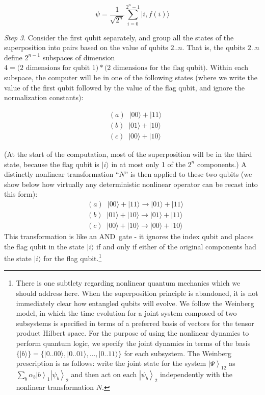 \documentclass[12pt]{article}
\begin{document}
\begin{equation}
\psi=\frac{1}{\sqrt{2^{n}}}\sum\limits_{i=0}^{2^{n}-1}|i,f(i)\rangle
\end{equation}

\medskip\noindent
{\it Step 3}. Consider the first qubit separately, and group all the states of the
superposition into pairs based on the value of qubits $2..n$. That is, the
qubits $2..n$ define $2^{n-1}$ subspaces of dimension $4 = \text{(2 dimensions for
qubit 1)} * \text{(2 dimensions for the flag qubit)}$. Within each subspace, the
computer will be in one of the following states (where we write the value of
the first qubit followed by the value of the flag qubit, and ignore the
normalization constants):%

\begin{align}
&  (a)\;\;|00\rangle+|11\rangle\nonumber\\
&  (b)\;\;|01\rangle+|10\rangle\\
&  (c)\;\;|00\rangle+|10\rangle\nonumber
\end{align}

(At the start of the computation, most of the superposition will be in the
third state, because the flag qubit is
$\vert i \rangle$
in at most only 1 of the $2^{n}$ components.) A distinctly nonlinear
transformation ``$N$'' is then applied to these two qubits (we show below how
virtually any deterministic nonlinear operator can be recast into this form):
\begin{align}
&  (a)\;\;|00\rangle+|11\rangle\longrightarrow|01\rangle+|11\rangle\nonumber\\
&  (b)\;\;|01\rangle+|10\rangle\longrightarrow|01\rangle+|11\rangle\\
&  (c)\;\;|00\rangle+|10\rangle\longrightarrow|00\rangle+|10\rangle\nonumber
\end{align}\goodbreak
\noindent
This transformation is like an AND\ gate - it ignores the index qubit and
places the flag qubit in the state
$\vert i \rangle$
if and only if either of the original components had the state
$\vert i \rangle$ for the flag qubit.\footnote{There is one subtlety regarding nonlinear quantum
mechanics which we should address here. When the superposition principle is
abandoned, it is not immediately clear how entangled qubits will evolve. We
follow the Weinberg model, in which the time evolution for a joint system
composed of two subsystems is specified in terms of a preferred basis of
vectors for the tensor product Hilbert space. For the purpose of using the
nonlinear dynamics to perform quantum logic, we specify the joint dynamics in
terms of the basis $\{\vert b \rangle\} = \{ \vert 0..00\rangle, \vert 0..01\rangle, \dots ,\vert 0..11\rangle\}$
for each subsystem. The Weinberg prescription is as follows: write the
joint state for the system $\left|  \Psi\right\rangle _{12}$ as $\sum
\limits_{b}\alpha_{b}\left|  b\right\rangle _{1}\left|  \psi_{b}\right\rangle
_{2}$ and then act on each $\left|  \psi_{b}\right\rangle _{2}$ independently
with the nonlinear transformation $N$.}
\end{document}
